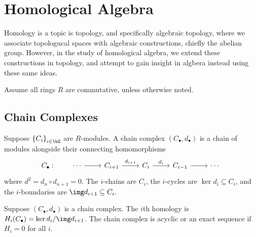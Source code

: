 \chapter{Homological Algebra}

\begin{remark}
    Homology is a topic is topology, and specifically algebraic topology,
    where we associate topologucal spaces with algebraic constructions,
    chiefly the abelian group.
    However, in the study of homological algebra,
    we extend these constructions in topology,
    and attempt to gain insight in algbera instead using these same ideas.
\end{remark}

\begin{remark}
    Assume all rings \(R\) are commutative, unless otherwise noted.
\end{remark}


\section{Chain Complexes}

\begin{definition}
    Suppose \({\{C_i\}}_{i\in\bZ}\) are \(R\)-modules.
    A chain complex \((C_\bullet,d_\bullet)\) is a chain of modules
    alongside their connecting homomorphisms
    \begin{equation*}
        C_\bullet: \qquad
        \begin{tikzcd}
            \cdots \arrow{r} & C_{i+1} \arrow{r}{d_{i+1}} &
            C_i \arrow{r}{d_i} & C_{i-1} \arrow{r} & \cdots
        \end{tikzcd}
    \end{equation*}
    where \(d^2 = d_n \circ d_{n+1} = 0\).
    The \(i\)-chains are \(C_i\),
    the \(i\)-cycles are \(\ker d_i \subseteq C_i\),
    and the \(i\)-boundaries are \(\img d_{i+1} \subseteq C_i\).
\end{definition}
\begin{definition}
    Suppose \((C_\bullet,d_\bullet)\) is a chain complex.
    The \(i\)th homology is \(H_i(C_\bullet) = \ker d_i/\img d_{i+1}\).
    The chain complex is acyclic or an exact sequence if \(H_i = 0\) for all \(i\).
\end{definition}

